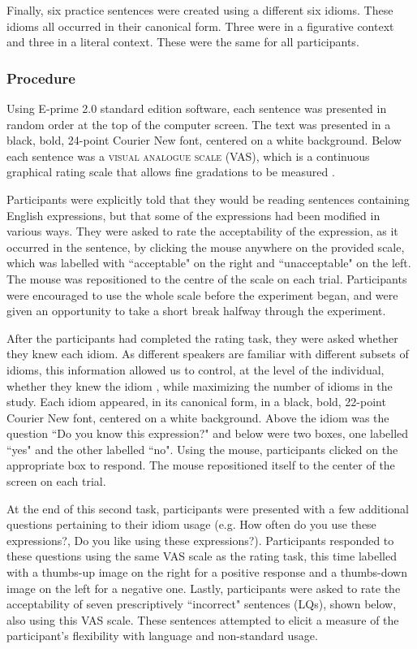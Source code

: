 \documentclass[output=paper,modfonts,nonflat]{langsci/langscibook}
\begin{document}
Finally, six practice sentences were created using a different six idioms. These idioms all occurred in their canonical form. Three were in a figurative context and three in a literal context. These were the same for all participants. 


\subsubsection{Procedure}

Using E-prime 2.0 standard edition software, each sentence was presented in random order at the top of the computer screen. The text was presented in a black, bold, 24-point Courier New font, centered on a white background. Below each sentence was a \textsc{visual analogue scale} (VAS), which is a continuous graphical rating scale that allows fine gradations to be measured \citep{FunkeReips2012}. 

Participants were explicitly told that they would be reading sentences containing English expressions, but that some of the expressions had been modified in various ways. They were asked to rate the acceptability of the expression, as it occurred in the sentence, by clicking the mouse anywhere on the provided scale, which was labelled with ``acceptable" on the right and ``unacceptable" on the left. The mouse was repositioned to the centre of the scale on each trial. Participants were encouraged to use the whole scale before the experiment began, and were given an opportunity to take a short break halfway through the experiment. 

After the participants had completed the rating task, they were asked whether they knew each idiom. As different speakers are familiar with different subsets of idioms, this information allowed us to control, at the level of the individual, whether they knew the idiom \citep{Cacciari2005}, while maximizing the number of idioms in the study. Each idiom appeared, in its canonical form, in a black, bold, 22-point Courier New font, centered on a white background. Above the idiom was the question ``Do you know this expression?" and below were two boxes, one labelled ``yes" and the other labelled ``no". Using the mouse, participants clicked on the appropriate box to respond. The mouse repositioned itself to the center of the screen on each trial.

At the end of this second task, participants were presented with a few additional questions pertaining to their idiom usage (e.g. How often do you use these expressions?, Do you like using these expressions?). Participants responded to these questions using the same VAS scale as the rating task, this time labelled with a thumbs-up image on the right for a positive response and a thumbs-down image on the left for a negative one. Lastly, participants were asked to rate the acceptability of seven prescriptively ``incorrect" sentences (LQs), shown below, also using this VAS scale. These sentences attempted to elicit a measure of the participant's flexibility with language and non-standard usage.\\
\end{document}
